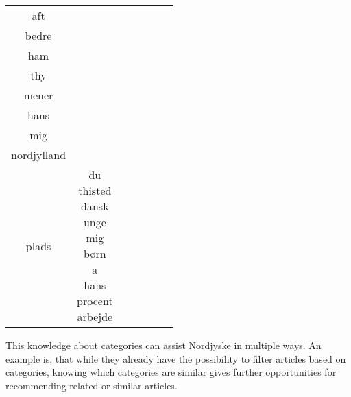 \begin{table*}[h]
\begin{tabular}{c|c|c|c|c|c|c}
aft \\ bedre \\ ham \\ thy \\ mener \\ hans \\ mig \\ nordjylland \\ plads} & \makecell{du \\ thisted \\ dansk \\ unge \\ mig \\ børn \\ a \\ hans \\ procent \\ arbejde} \\
		\bottomrule
	\end{tabular}
	\label{tab:category_top_words}
\end{table*}

This knowledge about categories can assist Nordjyske in multiple ways.
An example is, that while they already have the possibility to filter articles based on categories, knowing which categories are similar gives further opportunities for recommending related or similar articles.
